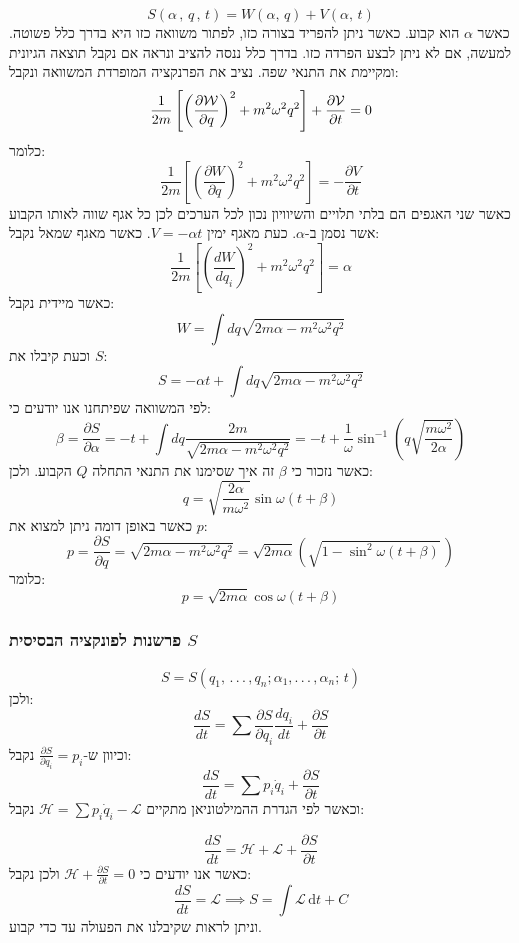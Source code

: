 \documentclass{tstextbook}
\begin{document}
$$S(\alpha\,,\,q\,,\,t)=W(\alpha,\,q)+V(\alpha,\,t)$$
כאשר \(\alpha\) הוא קבוע. כאשר ניתן להפריד בצורה כזו, לפתור משוואה כזו היא בדרך כלל פשוטה. למעשה, אם לא ניתן לבצע הפרדה כזו. בדרך כלל ננסה להציב ונראה אם נקבל תוצאה הגיונית ומקיימת את התנאי שפה. נציב את הפרנקציה המופרדת המשוואה ונקבל:
$$\frac{1}{2m}\left[\left(\frac{\partial{\cal W}}{\partial q}\right)^{2}+m^{2}\omega^{2}q^{2}\right]+\frac{\partial{\cal V}}{\partial t}=0$$
כלומר:
$${\frac{1}{2m}}\left[\left({\frac{\partial W}{\partial q}}\right)^{2}+m^{2}\omega^{2}q^{2}\right]=-{\frac{\partial V}{\partial t}}$$
כאשר שני האגפים הם בלתי תלויים והשיוויון נכון לכל הערכים לכן כל אגף שווה לאותו הקבוע אשר נסמן ב-\(\alpha\). כעת מאגף ימין \(V=-\alpha t\). כאשר מאגף שמאל נקבל:
$${\frac{1}{2m}}\left[\left({\frac{d W}{d q_{i}}}\right)^{2}+m^{2}\omega^{2}q^{2}\right]=\alpha$$
כאשר מיידית נקבל:
$$W=\int d q\sqrt{2m\alpha-m^{2}\omega^{2}q^{2}}$$
וכעת קיבלו את \(S\):
$$S=-\alpha t+\int d q\sqrt{2m\alpha-m^{2}\omega^{2}q^{2}}$$
לפי המשוואה שפיתחנו אנו יודעים כי:
$$\beta=\frac{\partial S}{\partial\alpha}=-t+\int d q\frac{2m}{\sqrt{2m\alpha-m^{2}\omega^{2}q^{2}}}=-t+\frac{1}{\omega}\sin^{-1}\left(q\sqrt{\frac{m\omega^{2}}{2\alpha}}\right)$$
כאשר נזכור כי \(\beta\) זה איך שסימנו את התנאי התחלה \(Q\) הקבוע. ולכן:
$$q={\sqrt{\frac{2\alpha}{m\omega^{2}}}}\sin\omega(t+\beta)$$
כאשר באופן דומה ניתן למצוא את \(p\):
$$p=\frac{\partial S}{\partial q}=\sqrt{2m\alpha-m^{2}\omega^{2}q^{2}}=\sqrt{2m\alpha}\left(\sqrt{1-\sin^{2}\omega(t+\beta)}\,\right)$$
כלומר:
$$p={\sqrt{2m\alpha}}\cos\omega(t+\beta)$$

\subsubsection{פרשנות לפונקציה הבסיסית \(S\)}

$$S=S(q_{1},\,.\,.\,.\,,q_{n};\alpha_{1},.\,.\,.\,,\alpha_{n};\,t)$$
ולכן:
$${\frac{d S}{d t}}=\sum{\frac{\partial S}{\partial q_{i}}}{\frac{d q_{i}}{d t}}+{\frac{\partial S}{\partial t}}$$
וכיוון ש-\(\frac{\partial S}{\partial q_{i}}=p_{i}\) נקבל:
$$\frac{d S}{d t}=\sum p_{i}{\dot{q}}_{i}+\frac{\partial S}{\partial t}$$
וכאשר לפי הגדרת ההמילטוניאן מתקיים \(\mathcal{\mathcal{H}}=\sum p_{i}\dot{q}_{i}-\mathcal{\mathcal{L}}\) נקבל:

$$\frac{d S}{d t}=\mathcal{H}+\mathcal{L}+\frac{\partial S}{\partial t}$$
כאשר אנו יודעים כי \(\mathcal{H}+\frac{\partial S}{\partial t}=0\) ולכן נקבל:
$$\frac{dS}{dt}=\mathcal{\mathcal{L}} \implies S=\int \mathcal{\mathcal{L}}   \, \mathrm{d}t +C  $$
וניתן לראות שקיבלנו את הפעולה עד כדי קבוע.
\end{document}
